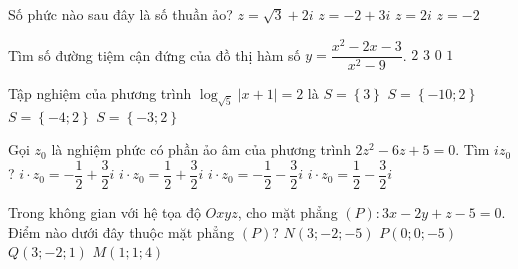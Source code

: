 \begin{ex}%
Số phức nào sau đây là số thuần ảo?
\choice
{$z = \sqrt{3} + 2i$}
{$z = - 2 + 3i$}
{\True $z = 2i$}
{$z = - 2$}
\end{ex}
\begin{ex}%
Tìm số đường tiệm cận đứng của đồ thị hàm số $y = \dfrac{x^2 - 2x - 3}{x^2 - 9}$.
\choice
{$2$}
{$3$}
{$0$}
{\True $1$}
\end{ex}
\begin{ex}%
Tập nghiệm của phương trình $\log_{\sqrt{5}} \left|x + 1\right| = 2$ là
\choice
{$S = \left\{3\right\}$}
{$S = \left\{-10;2\right\}$}
{\True $S = \left\{-4;2\right\}$}
{$S = \left\{-3;2\right\}$}
\end{ex}
\begin{ex}%
Gọi $z_0$ là nghiệm phức có phần ảo âm của phương trình $2z^2 - 6z + 5 = 0$. Tìm $iz_0$?
\choice
{$i\cdot z_0 = - \dfrac{1}{2} + \dfrac{3}{2}i$}
{\True $i\cdot z_0 = \dfrac{1}{2} + \dfrac{3}{2}i$}
{$i\cdot z_0 = - \dfrac{1}{2} - \dfrac{3}{2}i$}
{$i\cdot z_0 = \dfrac{1}{2} - \dfrac{3}{2}i$}
\end{ex}
\begin{ex}%
Trong không gian với hệ tọa độ $Oxyz$, cho mặt phẳng $\left(P\right)\colon 3x - 2y + z - 5 = 0$. Điểm nào dưới đây thuộc mặt phẳng $\left(P\right)$?
\choice
{$N\left(3;-2;-5\right)$}
{$P\left(0;0;-5\right)$}
{$Q\left(3;-2;1\right)$}
{\True $M\left(1;1;4\right)$}
\end{ex}
